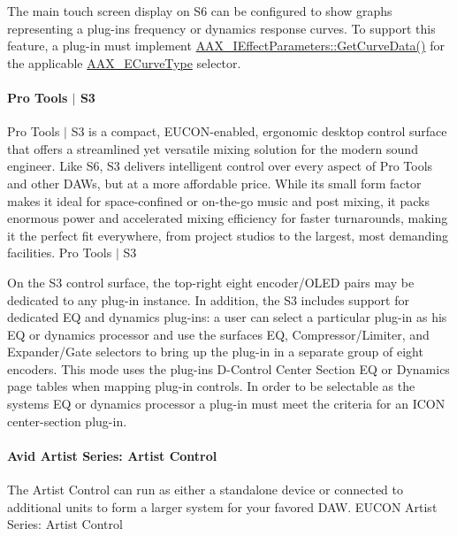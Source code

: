 The main touch screen display on S6 can be configured to show graphs representing a plug-\/in\textquotesingle{}s frequency or dynamics response curves. To support this feature, a plug-\/in must implement \mbox{\hyperlink{a00812_gaa85bda4027342eb644a9c92a17da6d49}{A\+A\+X\+\_\+\+I\+Effect\+Parameters\+::\+Get\+Curve\+Data()}} for the applicable \mbox{\hyperlink{a00812_ga59c73d8f51c5c55d54a728eff39da884}{A\+A\+X\+\_\+\+E\+Curve\+Type}} selector.

\hypertarget{a00833_subsubsection__avid_s3}{}\paragraph{Pro Tools $\vert$ S3}\label{a00833_subsubsection__avid_s3}
Pro Tools $\vert$ S3 is a compact, E\+U\+C\+O\+N-\/enabled, ergonomic desktop control surface that offers a streamlined yet versatile mixing solution for the modern sound engineer. Like S6, S3 delivers intelligent control over every aspect of Pro Tools and other D\+A\+Ws, but at a more affordable price. While its small form factor makes it ideal for space-\/confined or on-\/the-\/go music and post mixing, it packs enormous power and accelerated mixing efficiency for faster turnarounds, making it the perfect fit everywhere, from project studios to the largest, most demanding facilities.   Pro Tools $\vert$ S3 

On the S3 control surface, the top-\/right eight encoder/\+O\+L\+ED pairs may be dedicated to any plug-\/in instance. In addition, the S3 includes support for dedicated EQ and dynamics plug-\/ins\+: a user can select a particular plug-\/in as his EQ or dynamics processor and use the surface\textquotesingle{}s EQ, Compressor/\+Limiter, and Expander/\+Gate selectors to bring up the plug-\/in in a separate group of eight encoders. This mode uses the plug-\/in\textquotesingle{}s D-\/\+Control Center Section EQ or Dynamics page tables when mapping plug-\/in controls. In order to be selectable as the system\textquotesingle{}s EQ or dynamics processor a plug-\/in must meet the criteria for an I\+C\+ON center-\/section plug-\/in.

\hypertarget{a00833_subsubsection__avid_artist_series_mc_control_v2_}{}\paragraph{Avid Artist Series\+: Artist Control}\label{a00833_subsubsection__avid_artist_series_mc_control_v2_}
 The Artist Control can run as either a standalone device or connected to additional units to form a larger system for your favored D\+AW.   E\+U\+C\+ON Artist Series\+: Artist Control 

